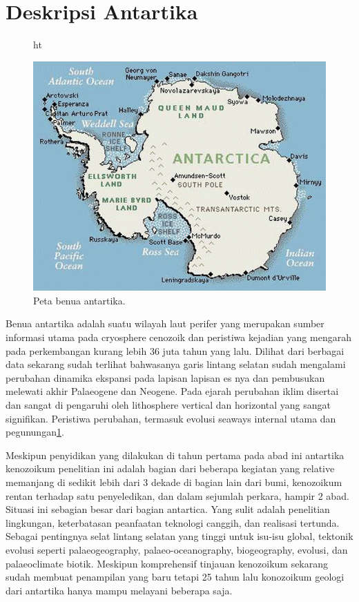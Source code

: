 





\section{Deskripsi Antartika}

\begin{figure}{ht}
\centerline{\includegraphics[width=1\textwidth]{figures/antartic.PNG}}
\caption{Peta benua antartika.}
\label{Antartika}
\end{figure}

		Benua antartika adalah suatu wilayah laut perifer yang merupakan sumber informasi utama pada cryosphere cenozoik dan peristiwa 
	kejadian yang mengarah pada perkembangan kurang lebih 36 juta tahun yang lalu. Dilihat dari berbagai data sekarang sudah terlihat bahwasanya 
	garis lintang selatan sudah mengalami perubahan dinamika ekspansi pada lapisan lapisan es nya dan pembusukan melewati akhir Palaeogene dan Neogene. 
	Pada ejarah perubahan iklim disertai dan sangat di pengaruhi oleh lithosphere vertical dan horizontal yang sangat signifikan. Peristiwa perubahan, 
	termasuk evolusi seaways internal utama dan pegunungan\ref{Antartika}. 
		
		Meskipun penyidikan yang dilakukan di tahun pertama pada abad ini antartika kenozoikum penelitian ini adalah bagian dari beberapa kegiatan yang 
	relative memanjang di sedikit lebih dari 3 dekade di bagian lain dari bumi, kenozoikum rentan terhadap satu penyeledikan, dan dalam sejumlah perkara, 
	hampir 2 abad. Situasi ini sebagian besar dari bagian antartica. Yang sulit adalah penelitian lingkungan, keterbatasan peanfaatan teknologi canggih, 
	dan realisasi tertunda. Sebagai pentingnya selat lintang selatan yang tinggi untuk isu-isu global, tektonik evolusi seperti  palaeogeography, 
	palaeo-oceanography, biogeography, evolusi, dan palaeoclimate biotik. Meskipun komprehensif tinjauan kenozoikum sekarang sudah membuat penampilan yang baru 
	tetapi 25 tahun lalu konozoikum geologi dari antartika hanya mampu melayani beberapa saja.
	
